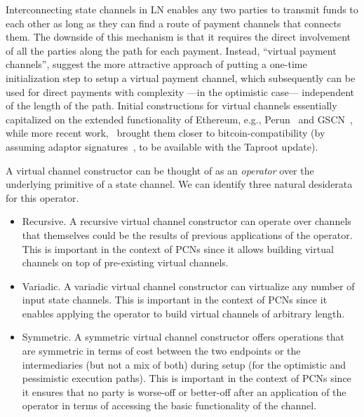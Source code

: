 Interconnecting state channels in LN enables any two parties to transmit funds to each other as long as they can find a route of payment channels that connects them. The downside of this mechanism is that it requires the direct involvement of all the parties along the path for each payment. Instead, ``virtual payment channels'', suggest the more attractive approach of putting a one-time initialization step to setup a virtual payment channel, which subsequently can be used for direct payments with complexity  ---in the optimistic case---  independent of the length of the path. 
Initial constructions for virtual channels essentially capitalized on the extended functionality of Ethereum, e.g., 
Perun~\cite{perun} and GSCN~\cite{DBLP:conf/ccs/DziembowskiFH18}, while more
recent work,~\cite{cryptoeprint:2020:554}   brought them closer to bitcoin-compatibility (by assuming adaptor
signatures~\cite{cryptoeprint:2020:476}, to be available with the Taproot update). 

A virtual channel constructor can be thought of as an  {\em operator} over the underlying primitive of a state channel. We can identify three   natural desiderata for this operator. 

\begin{itemize}
\item Recursive. A recursive virtual channel constructor can operate over channels that themselves could be the results of previous applications of the operator. This is important in the context of PCNs since it allows building virtual channels on top of pre-existing virtual channels.
\item Variadic. A variadic virtual channel constructor can virtualize any number of input state channels. This is important in the context of PCNs since it enables applying the operator to build virtual channels of arbitrary length.
\item Symmetric. A symmetric virtual channel constructor offers operations that are symmetric in terms of cost between the two endpoints or the intermediaries (but not a mix of both) during setup (for the optimistic and pessimistic execution paths). This is important in the context of PCNs since it ensures that no party is worse-off or better-off after an application of the operator in terms of accessing the basic functionality of the channel. 
\end{itemize}

